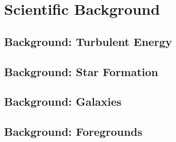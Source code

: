 \section{Scientific Background}


\subsection{Background: Turbulent Energy}
\label{sec.back_turb}


\subsection{Background: Star Formation}
\label{sec.back_cores}


\subsection{Background: Galaxies}
\label{sec.back_galaxies}


\subsection{Background: Foregrounds}
\label{sec.back_foregrounds}


